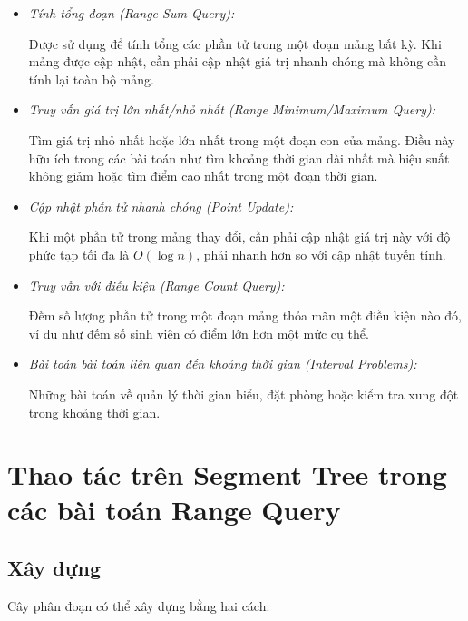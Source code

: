 \documentclass[a4paper]{article}
\begin{document}
\begin{itemize}[label = $\circ$]
    \item \textit{Tính tổng đoạn (Range Sum Query)}\textit{: }
    
    Được sử dụng để tính tổng các phần tử trong một đoạn mảng bất kỳ. Khi mảng được cập nhật, cần phải cập nhật giá trị nhanh chóng mà không cần tính lại toàn bộ mảng. 
    \item \textit{Truy vấn giá trị lớn nhất/nhỏ nhất (Range Minimum/Maximum Query):}
    
    Tìm giá trị nhỏ nhất hoặc lớn nhất trong một đoạn con của mảng. Điều này hữu ích trong các bài toán như tìm khoảng thời gian dài nhất mà hiệu suất không giảm hoặc tìm điểm cao nhất trong một đoạn thời gian.
    \item \textit{Cập nhật phần tử nhanh chóng (Point Update):}
    
    Khi một phần tử trong mảng thay đổi, cần phải cập nhật giá trị này với độ phức tạp tối đa là \(O(\log n)\), phải nhanh hơn so với cập nhật tuyến tính. 
    \item \textit{Truy vấn với điều kiện (Range Count Query): }
    
    Đếm số lượng phần tử trong một đoạn mảng thỏa mãn một điều kiện nào đó, ví dụ như đếm số sinh viên có điểm lớn hơn một mức cụ thể.
    \item \textit{Bài toán bài toán liên quan đến khoảng thời gian (Interval Problems):}
    
    Những bài toán về quản lý thời gian biểu, đặt phòng hoặc kiểm tra xung đột trong khoảng thời gian.
\end{itemize}
\pagebreak
\section{Thao tác trên Segment Tree trong các bài toán Range Query}
\subsection{Xây dựng}
\hspace{0.5cm}Cây phân đoạn có thể xây dựng bằng hai cách:\medskip
\end{document}
